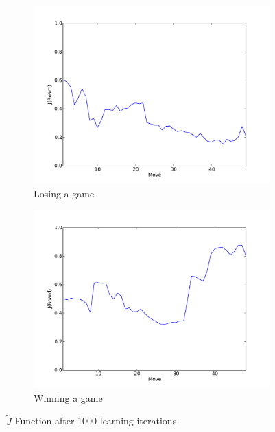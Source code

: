 \documentclass[11pt]{article}
\begin{document}
\begin{figure}[htbp]
  \begin{subfigure}{0.45\textwidth}
    \centering
    \includegraphics[width=\linewidth]{../Graphs/J_improved_1000iteration_lost.pdf}
    \caption{Losing a game}
    \label{fig:learned_j_lost}
  \end{subfigure}
  \hspace{1em}
  \begin{subfigure}{0.45\textwidth}
    \centering
    \includegraphics[width=\linewidth]{../Graphs/J_improved_1000iteration_won.pdf}
    \caption{Winning a game}
    \label{fig:learned_j_win}
  \end{subfigure}
  \caption{$\tilde{J}$ Function after 1000 learning iterations}
  \label{fig:learned_j}
\end{figure}
\end{document}
